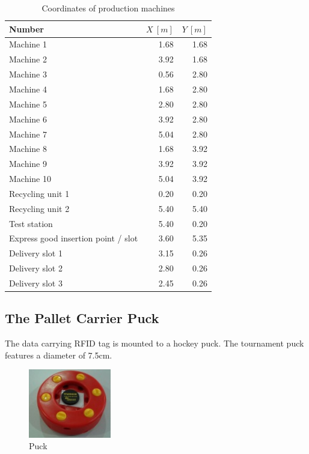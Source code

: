 \documentclass[12pt,twoside]{article}
\begin{document}
\begin{table}[h]
  \centering
  \begin{tabular}{l|r|r}
    \multicolumn{1}{l}{Number} & \multicolumn{1}{l}{$X~[m]$} & \multicolumn{1}{l}{$Y~[m]$}\\ \hline
    Machine 1 & 1.68 & 1.68 \\
    Machine 2 & 3.92 & 1.68 \\
    Machine 3 & 0.56 & 2.80 \\
    Machine 4 & 1.68 & 2.80 \\
    Machine 5 & 2.80 & 2.80 \\
    Machine 6 & 3.92 & 2.80 \\
    Machine 7 & 5.04 & 2.80 \\
    Machine 8 & 1.68 & 3.92 \\
    Machine 9 & 3.92 & 3.92 \\
    Machine 10 & 5.04 & 3.92 \\
    Recycling unit 1 & 0.20 & 0.20 \\
    Recycling unit 2 & 5.40 & 5.40 \\
    Test station &	5.40  &0.20 \\
    Express good insertion point / slot & 	3.60 & 	5.35 \\
    Delivery slot 1 & 	3.15 & 0.26 \\
    Delivery slot 2 &	2.80 & 0.26 \\ 
    Delivery slot 3 &	2.45 & 0.26 \\\hline
  \end{tabular}

  \caption{Coordinates of production machines}
  \label{tab:coordinates}
\end{table}

\subsection{The Pallet Carrier Puck}
The data carrying RFID tag is mounted to a hockey puck. The tournament
puck features a diameter of 7.5cm.

\begin{figure}[h!]
  \centering
  \includegraphics[height=3cm]{125px-Puck}
  \caption{Puck}
  \label{fig:puck}
\end{figure}
\end{document}

